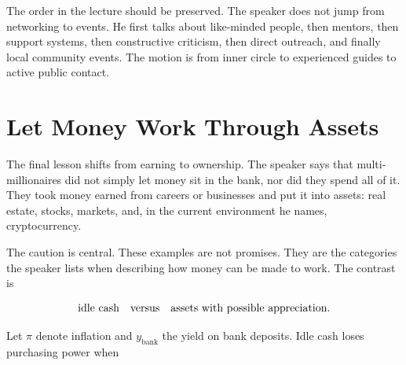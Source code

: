 \begin{figure}
\centering
{}
\end{figure}

The order in the lecture should be preserved. The speaker does not jump from networking to events. He first talks about like-minded people, then mentors, then support systems, then constructive criticism, then direct outreach, and finally local community events. The motion is from inner circle to experienced guides to active public contact.

\section{Let Money Work Through Assets}

The final lesson shifts from earning to ownership. The speaker says that multi-millionaires did not simply let money sit in the bank, nor did they spend all of it. They took money earned from careers or businesses and put it into assets: real estate, stocks, markets, and, in the current environment he names, cryptocurrency.

The caution is central. These examples are not promises. They are the categories the speaker lists when describing how money can be made to work. The contrast is

\begin{equation}
\text{idle cash}
\quad\hbox{versus}\quad
\text{assets with possible appreciation}.
\end{equation}

Let \(\pi\) denote inflation and \(y_{\text{bank}}\) the yield on bank deposits. Idle cash loses purchasing power when

